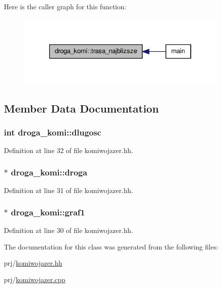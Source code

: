 \-Here is the caller graph for this function\-:
\nopagebreak
\begin{figure}[H]
\begin{center}
\leavevmode
\includegraphics[width=298pt]{classdroga__komi_a7d6a3684fd92f231b31597a24e3e6914_icgraph}
\end{center}
\end{figure}




\subsection{\-Member \-Data \-Documentation}
\hypertarget{classdroga__komi_a7f2bb9dfb6fdbdcdd67fa8e6bd53b0a6}{
\subsubsection[{dlugosc}]{\setlength{\rightskip}{0pt plus 5cm}int {\bf droga\-\_\-komi\-::dlugosc}}}\label{classdroga__komi_a7f2bb9dfb6fdbdcdd67fa8e6bd53b0a6}


\-Definition at line 32 of file komiwojazer.\-hh.

\hypertarget{classdroga__komi_a4d4d9bdaaf335bb3ec6617acc60754ce}{
\subsubsection[{droga}]{$\ast$ {\bf droga\-\_\-komi\-::droga}}}\label{classdroga__komi_a4d4d9bdaaf335bb3ec6617acc60754ce}


\-Definition at line 31 of file komiwojazer.\-hh.

\hypertarget{classdroga__komi_a3bdab6c27afa54acc53a4a9f37b5745e}{
\subsubsection[{graf1}]{$\ast$ {\bf droga\-\_\-komi\-::graf1}}}\label{classdroga__komi_a3bdab6c27afa54acc53a4a9f37b5745e}


\-Definition at line 30 of file komiwojazer.\-hh.



\-The documentation for this class was generated from the following files\-:\begin{DoxyCompactItemize}
\item 
prj/\hyperlink{komiwojazer_8hh}{komiwojazer.\-hh}\item 
prj/\hyperlink{komiwojazer_8cpp}{komiwojazer.\-cpp}\end{DoxyCompactItemize}

